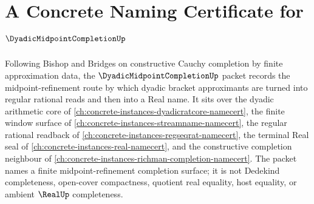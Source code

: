 \chapter{A Concrete Naming Certificate for $\DyadicMidpointCompletionUp$}
\label{ch:concrete-instances-dyadic-midpoint-completion-namecert}

Following Bishop and Bridges on constructive Cauchy completion by finite approximation data, the $\DyadicMidpointCompletionUp$ packet records the midpoint-refinement route by which dyadic bracket approximants are turned into regular rational reads and then into a Real name. It sits over the dyadic arithmetic core of \autoref{ch:concrete-instances-dyadicratcore-namecert}, the finite window surface of \autoref{ch:concrete-instances-streamname-namecert}, the regular rational readback of \autoref{ch:concrete-instances-regseqrat-namecert}, the terminal Real seal of \autoref{ch:concrete-instances-real-namecert}, and the constructive completion neighbour of \autoref{ch:concrete-instances-richman-completion-namecert}. The packet names a finite midpoint-refinement completion surface; it is not Dedekind completeness, open-cover compactness, quotient real equality, host equality, or ambient $\RealUp$ completeness.

